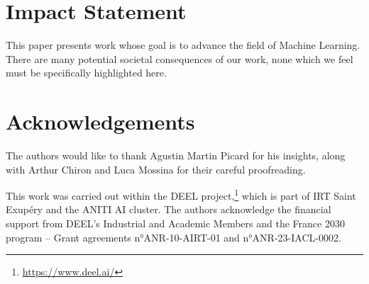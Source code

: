 \section*{Impact Statement}

This paper presents work whose goal is to advance the field of Machine Learning. There are many potential societal consequences of our work, none which we feel must be specifically highlighted here.

\section*{Acknowledgements}

The authors would like to thank Agustin Martin Picard for his insights, along with Arthur Chiron and Luca Mossina for their careful proofreading.

This work was carried out within the DEEL project,\footnote{\url{https://www.deel.ai/}} which is part of IRT Saint Exupéry and the ANITI AI cluster. The authors acknowledge the financial support from DEEL's Industrial and Academic Members and the France 2030 program – Grant agreements n°ANR-10-AIRT-01 and n°ANR-23-IACL-0002.